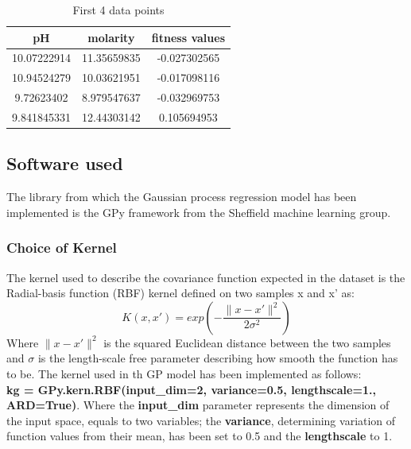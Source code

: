 \documentclass[a4paper]{article}
\begin{document}
\begin{table}[]
	\centering
	\caption{First 4 data points}
	\label{table}
	\begin{tabular}{|c|c|c|}
		\hline
		\textbf{pH} & \textbf{molarity} & \textbf{fitness values} \\ \hline
		10.07222914 & 11.35659835       & -0.027302565            \\ \hline
		10.94524279 & 10.03621951       & -0.017098116            \\ \hline
		9.72623402  & 8.979547637       & -0.032969753            \\ \hline
		9.841845331 & 12.44303142       & 0.105694953             \\ \hline
	\end{tabular}
\end{table}

\subsection{Software used}
The library from which the Gaussian process regression model has been implemented is the GPy framework from the Sheffield machine learning group. \cite{gpy}

\subsubsection{Choice of Kernel}
The kernel used to describe the covariance function expected in the dataset is the Radial-basis function (RBF) kernel defined on two samples x and x' as: 
\begin{equation}
	K({ x },{ x' })=exp\left( -{ \frac { \| { x }-{ x' }\| ^{ 2 } }{ 2\sigma ^{ 2 } }  } \right)
\end{equation}
Where $\| { x }-{ x' }\| ^{ 2 }$ is the squared Euclidean distance between the two samples and $\sigma$ is the length-scale free parameter describing how smooth the function has to be. 
The kernel used in th GP model has been implemented as follows:
\\\textbf{kg = GPy.kern.RBF(input\_dim=2, variance=0.5, lengthscale=1., ARD=True)}. 
Where the \textbf{input\_dim} parameter represents the dimension of the input space, equals to two variables; the \textbf{variance}, determining variation of function values from their mean, has been set to 0.5 and the \textbf{lengthscale} to 1.
\end{document}
